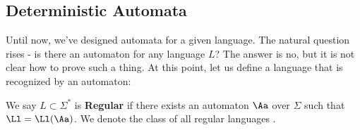 \subsection{Deterministic Automata}
Until now, we've designed automata for a given language. The natural question rises - is there an automaton for any language $L$? The answer is no, but it is not clear how to prove such a thing. At this point, let us define a language that is recognized by an automaton:
\begin{yellowBox}
	\begin{defn} We say $L\subset \Sigma^*$ is \textbf{Regular} if there exists an automaton $\Aa$ over $\Sigma$ such that 
		$\Ll = \Ll(\Aa)$. We denote the class of all regular languages \textbf{\Reg}.
	\end{defn}
\end{yellowBox}

